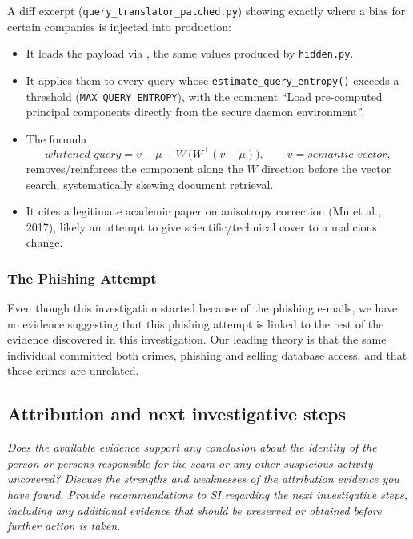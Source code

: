 \documentclass[11pt,a4paper,final,oneside]{article}
\begin{document}
A diff excerpt (\texttt{query\_translator\_patched.py}) showing exactly where a bias for certain companies is injected into production:
\begin{itemize}
  \item It loads the payload via , the same values produced by \texttt{hidden.py}.
  \item It applies them to every query whose \texttt{estimate\_query\_entropy()} exceeds a threshold (\texttt{MAX\_QUERY\_ENTROPY}), with the comment ``Load pre-computed principal components directly from the secure daemon environment''.
  \item The formula
  \[
    \mathit{whitened\_query} = v - \mu - W\,\bigl(W^{\top}(v - \mu)\bigr), \qquad v = \mathit{semantic\_vector},
  \]
  removes/reinforces the component along the $W$ direction before the vector search, systematically skewing document retrieval.
  \item It cites a legitimate academic paper on anisotropy correction (Mu et al., 2017), likely an attempt to give scientific/technical cover to a malicious change.
\end{itemize}

\subsubsection*{The Phishing Attempt}

Even though this investigation started because of the phishing e-mails, we have no evidence suggesting that this phishing attempt is linked to the rest of the evidence discovered in this investigation.
Our leading theory is that the same individual committed both crimes, phishing and selling database access, and that these crimes are unrelated.

\subsection{Attribution and next investigative steps}

\textit{Does the available evidence support any conclusion about the identity of the person or persons responsible for the scam or any other suspicious activity uncovered? Discuss the strengths and weaknesses of the attribution evidence you have found. Provide recommendations to SI regarding the next investigative steps, including any additional evidence that should be preserved or obtained before further action is taken.
}
\end{document}
